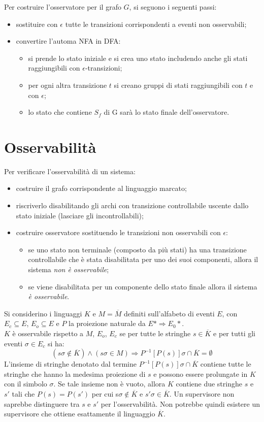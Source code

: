 \documentclass[a4paper, notitlepage, 10pt]{report}
\begin{document}
Per costruire l'osservatore per il grafo $G$, si seguono i seguenti passi:
\begin{itemize}
	\item sostituire con $\epsilon$ tutte le transizioni corrispondenti a eventi non osservabili;
	\item convertire l'automa NFA in DFA:
	\begin{itemize}
		\item si prende lo stato iniziale e si crea uno stato includendo anche gli stati raggiungibili con $\epsilon$-transizioni;
		\item per ogni altra transizione $t$ si creano gruppi di stati raggiungibili con $t$ e con $\epsilon$;
		\item lo stato che contiene $S_f$ di G sarà lo stato finale dell'osservatore.
		\end{itemize}
\end{itemize}



\section*{Osservabilità}
Per verificare l'osservabilità di un sistema:
\begin{itemize}
	\item costruire il grafo corrispondente al linguaggio marcato;
	\item riscriverlo disabilitando gli archi con transizione controllabile uscente dallo stato iniziale (lasciare gli incontrollabili);
	\item costruire osservatore sostituendo le transizioni non osservabili con $\epsilon$:
	\begin{itemize}
		\item se uno stato non terminale (composto da più stati) ha una transizione controllabile che è stata disabilitata per uno dei suoi componenti, allora il sistema \textit{non è osservabile};
		\item se viene disabilitata per un componente dello stato finale allora il sistema \textit{è osservabile}.
	\end{itemize}
\end{itemize}
\noindent
Si considerino i linguaggi $K$ e $M = \overline{M}$ definiti sull'alfabeto di eventi $E$, con $E_c \subseteq E$, $E_o \subseteq E$ e $P$ la proiezione naturale da $E* \Rightarrow E_0*$.
\\$K$ è osservabile rispetto a $M$, $E_o$, $E_c$ se per tutte le stringhe $s \in \overline{K}$ e per tutti gli eventi $\sigma \in E_c$ si ha: 
$$(s\sigma \notin \overline{K}) \land (s\sigma \in M) \Rightarrow P^{-1}[P(s)] \sigma  \cap \overline{K} = \emptyset$$
L'insieme di stringhe denotato dal termine $P^{-1}[P(s)] \sigma \cap \overline{K}$ contiene tutte le stringhe che hanno la medesima proiezione di $s$ e possono essere prolungate in $K$ con il simbolo $\sigma$. Se tale insieme non è vuoto, allora $K$ contiene due stringhe $s$ e $s'$ tali che $P(s)=P(s')$ per cui s$\sigma \notin \overline{K}$ e $s'\sigma \in \overline{K}$. Un supervisore non saprebbe distinguere tra $s$ e $s'$ per l'osservabilità. Non potrebbe quindi esistere un supervisore che ottiene esattamente il linguaggio $\overline{K}$.
\end{document}
